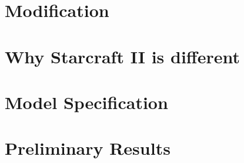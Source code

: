 \documentclass[ignorenonframetext,]{beamer}
\begin{document}
\section{Modification}\label{modification}

\section{Why Starcraft II is
different}\label{why-starcraft-ii-is-different}

\section{Model Specification}\label{model-specification}

\section{Preliminary Results}\label{preliminary-results}
\end{document}
